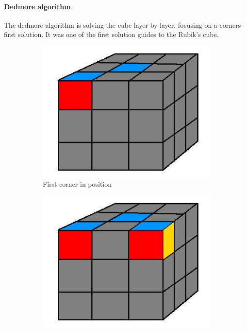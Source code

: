 \documentclass[a4paper,11pt]{kth-mag}
\begin{document}
\paragraph{Dedmore algorithm}
The dedmore algorithm is solving the cube layer-by-layer, focusing on a corners-first solution\cite{Dedmore}. It was one of the first solution guides to the Rubik's cube\cite{Ijsat}. \\
\begin{figure}[b]
	\centering
	\begin{subfigure}[!b]{0.3\textwidth}
		\includegraphics[width=\textwidth]{figs/rubiks-frst-corner.jpg}
		\caption{First corner in position}
		\label{fig_9}
	\end{subfigure}
	\begin{subfigure}[!b]{0.3\textwidth}
		\includegraphics[width=\textwidth]{figs/rubiks-scnd-corner.jpg}

\end{subfigure}
\end{figure}
\end{document}
